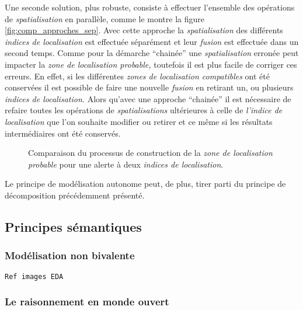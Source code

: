 Une seconde solution, plus robuste, consiste à effectuer l'ensemble
des opérations de \emph{spatialisation} en parallèle, comme le montre
la figure \ref{fig:comp_approches_sep}. Avec cette approche la
\emph{spatialisation} des différents \emph{indices de localisation}
est effectuée séparément et leur \emph{fusion} est effectuée dans un
second temps. Comme pour la démarche \enquote{chainée} une
\emph{spatialisation} erronée peut impacter la \emph{zone de
  localisation probable,} toutefois il est plus facile de corriger ces
erreurs. En effet, si les différentes \emph{zones de localisation
  compatibles} ont été conservées il est possible de faire une
nouvelle \emph{fusion} en retirant un, ou plusieurs \emph{indices de
  localisation.} Alors qu'avec une approche \enquote{chainée} il est
nécessaire de refaire toutes les opérations de \emph{spatialisations}
ultérieures à celle de \emph{l'indice de localisation} que l'on
souhaite modifier ou retirer et ce même si les résultats
intermédiaires ont été conservés.

\begin{figure}
  \centering

  \caption{Comparaison du processus de construction de la \emph{zone
      de localisation probable} pour une alerte à deux \emph{indices
      de localisation}.}
  \label{fig:comp_approches}
\end{figure}

Le principe de modélisation autonome peut, de plus, tirer parti du
principe de décomposition précédemment présenté.


\subsection{Principes sémantiques}

\subsubsection{Modélisation non bivalente}
\texttt{Ref images EDA}

\subsubsection{Le raisonnement en monde ouvert}


